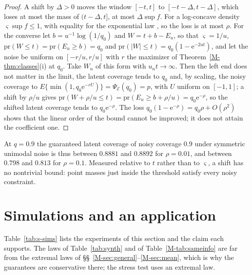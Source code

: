 \documentclass[11pt]{article}
\renewcommand{\_}{\usc\allowbreak}
\newcommand{\pr}{\mathrm{pr}}
\begin{document}
\begin{proof}
A shift by $\Delta > 0$ moves the window $[-t, t]$ to $[-t - \Delta, t - \Delta]$, which loses at most the mass of $(t - \Delta, t]$, at most $\Delta \sup f$. For a log-concave density $\varsigma \sup f \le 1$, with equality for the exponential law \citep{bobkov2015}, so the loss is at most $\rho$. For the converse let $b = u^{-1}\log(1/q_0)$ and $W = t + b - E_u$, so that $\varsigma = 1/u$, $\pr(W \le t) = \pr(E_u \ge b) = q_0$ and $\pr(|W| \le t) = q_0(1 - \mathrm{e}^{-2ut})$, and let the noise be uniform on $[-r/u, r/u]$ with $r$ the maximizer of Theorem~\ref{M-thm:classes}(i) at $q_0$. Take $W_n$ of this form with $u_n t \to \infty$. Then the left end does not matter in the limit, the latent coverage tends to $q_0$ and, by scaling, the noisy coverage to $E\{\min(1, q_0 \mathrm{e}^{-rU})\} = \Psi_{\mathcal E}(q_0) = p$, with $U$ uniform on $[-1, 1]$; a shift by $\rho/u$ gives $\pr(W + \rho/u \le t) = \pr(E_u \ge b + \rho/u) = q_0 \mathrm{e}^{-\rho}$, so the shifted latent coverage tends to $q_0\mathrm{e}^{-\rho}$. The loss $q_0(1 - \mathrm{e}^{-\rho}) = q_0\rho + O(\rho^2)$ shows that the linear order of the bound cannot be improved; it does not attain the coefficient one.
\end{proof}

At $q = 0.9$ the guaranteed latent coverage of noisy coverage $0.9$ under symmetric unimodal noise is thus between $0.8881$ and $0.8892$ for $\rho = 0.01$, and between $0.798$ and $0.813$ for $\rho = 0.1$. Measured relative to $t$ rather than to $\varsigma$, a shift has no nontrivial bound: point masses just inside the threshold satisfy every noisy constraint.

\section{Simulations and an application}\label{sec:s-sim}

Table~\ref{tab:s-sims} lists the experiments of this section and the claim each supports. The laws of Table~\ref{tab:synth} and of Table~\ref{M-tab:sameinfo} are far from the extremal laws of \S\S~\ref{M-sec:general}--\ref{M-sec:mean}, which is why the guarantees are conservative there; the stress test uses an extremal law.
\end{document}
